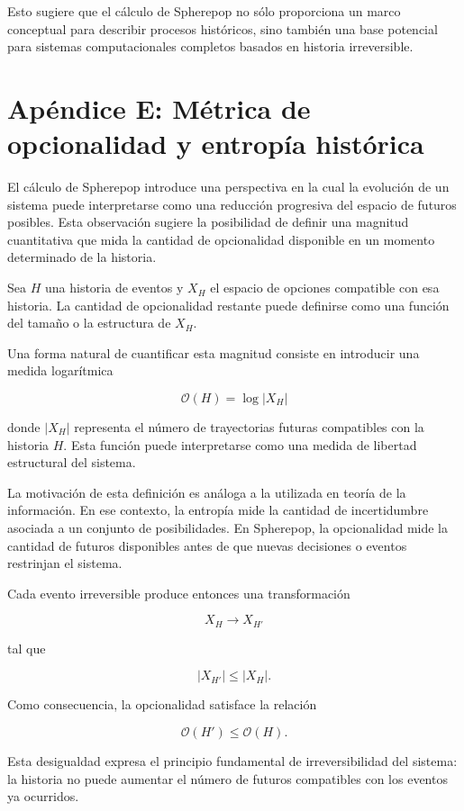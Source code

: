 \documentclass[12pt]{article}
\begin{document}
Esto sugiere que el cálculo de Spherepop no sólo proporciona un marco conceptual para describir procesos históricos, sino también una base potencial para sistemas computacionales completos basados en historia irreversible.

\section{Apéndice E: Métrica de opcionalidad y entropía histórica}

El cálculo de Spherepop introduce una perspectiva en la cual la evolución de un sistema puede interpretarse como una reducción progresiva del espacio de futuros posibles. Esta observación sugiere la posibilidad de definir una magnitud cuantitativa que mida la cantidad de opcionalidad disponible en un momento determinado de la historia.

Sea \(H\) una historia de eventos y \(X_H\) el espacio de opciones compatible con esa historia. La cantidad de opcionalidad restante puede definirse como una función del tamaño o la estructura de \(X_H\).

Una forma natural de cuantificar esta magnitud consiste en introducir una medida logarítmica

\[
\mathcal{O}(H) = \log |X_H|
\]

donde \(|X_H|\) representa el número de trayectorias futuras compatibles con la historia \(H\). Esta función puede interpretarse como una medida de libertad estructural del sistema.

La motivación de esta definición es análoga a la utilizada en teoría de la información. En ese contexto, la entropía mide la cantidad de incertidumbre asociada a un conjunto de posibilidades. En Spherepop, la opcionalidad mide la cantidad de futuros disponibles antes de que nuevas decisiones o eventos restrinjan el sistema.

Cada evento irreversible produce entonces una transformación

\[
X_H \rightarrow X_{H'}
\]

tal que

\[
|X_{H'}| \leq |X_H|.
\]

Como consecuencia, la opcionalidad satisface la relación

\[
\mathcal{O}(H') \leq \mathcal{O}(H).
\]

Esta desigualdad expresa el principio fundamental de irreversibilidad del sistema: la historia no puede aumentar el número de futuros compatibles con los eventos ya ocurridos.
\end{document}
